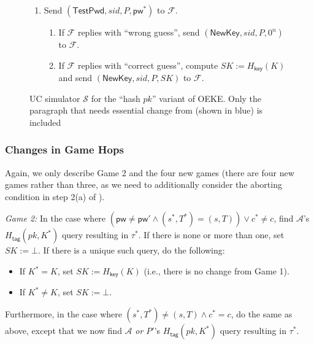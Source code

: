 \documentclass{article}
\theoremstyle{plain}
\theoremstyle{definition}
\theoremstyle{remark}
\newcommand{\adv}{\mathcal{A}}
\renewcommand{\sim}{\mathcal{S}}
\newcommand{\func}{\mathcal{F}}
\newcommand{\Hkey}{H_\mathsf{key}}
\newcommand{\Htag}{H_\mathsf{tag}}
\newcommand{\pw}{\mathsf{pw}}
\newcommand{\TestPwd}{\mathsf{TestPwd}}
\newcommand{\NewKey}{\mathsf{NewKey}}
\begin{document}
\begin{figure}[H]
\begin{framed}
\begin{small}
\begin{enumerate}
\begin{enumerate}
        \item Send $(\TestPwd, sid, P, \pw^*)$ to $\func$.
            \begin{enumerate}
              \item If $\func$ replies with ``wrong guess'', send $(\NewKey, sid, P, 0^n)$ to $\func$.
              \item If $\func$ replies with ``correct guess'', compute $SK := \Hkey(K)$ and send $(\NewKey, sid, P, SK)$ to $\func$.
            \end{enumerate}
      \end{enumerate}
\end{enumerate}
\end{small}
\end{framed}
\caption{UC simulator $\sim$ for the ``hash $pk$'' variant of OEKE. Only the paragraph that needs essential change from  (shown in {\color{blue}blue}) is included}
\label{fig:oeke-sim-hash-pk}
\end{figure}

\subsubsection{Changes in Game Hops}
\label{app:game-hops-hash-pk}
Again, we only describe Game 2 and the four new games (there are four new games rather than three, as we need to additionally consider the aborting condition in step 2(a) of ).

\medskip\noindent\emph{Game 2:} In the case where $(\pw \neq \pw' \land (s^*,T^*) = (s,T)) \lor c^* \neq c$, find $\adv$'s $\Htag(pk,K^*)$ query resulting in $\tau^*$. If there is none or more than one, set $SK := \bot$. If there is a unique such query, do the following:
\begin{itemize}
  \item If $K^* = K$, set $SK := \Hkey(K)$ (i.e., there is no change from Game 1).
  \item If $K^* \neq K$, set $SK := \bot$.
\end{itemize}

Furthermore, in the case where $(s^*,T^*) \neq (s,T) \land c^* = c$, do the same as above, except that we now find $\adv$ \emph{or $P'$}'s $\Htag(pk,K^*)$ query resulting in $\tau^*$.
\end{document}
